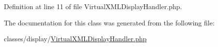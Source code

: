 Definition at line 11 of file Virtual\+X\+M\+L\+Display\+Handler.\+php.



The documentation for this class was generated from the following file\+:\begin{DoxyCompactItemize}
\item 
classes/display/\hyperlink{VirtualXMLDisplayHandler_8php}{Virtual\+X\+M\+L\+Display\+Handler.\+php}\end{DoxyCompactItemize}
